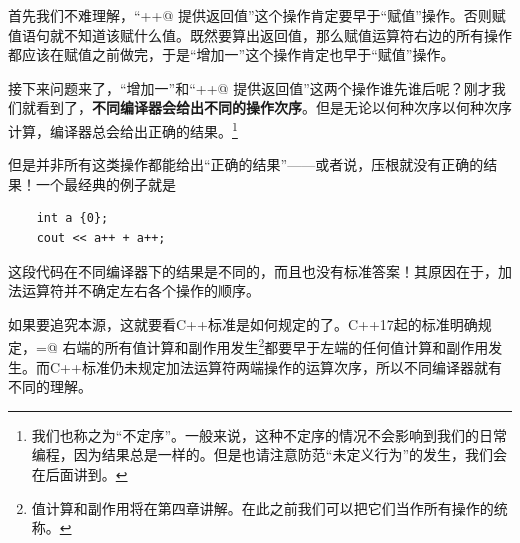 首先我们不难理解，``\lstinline@a++@ 提供返回值''这个操作肯定要早于``赋值''操作。否则赋值语句就不知道该赋什么值。既然要算出返回值，那么赋值运算符右边的所有操作都应该在赋值之前做完，于是``\lstinline@a@ 增加一''这个操作肯定也早于``赋值''操作。\par
接下来问题来了，``\lstinline@a@ 增加一''和``\lstinline@a++@ 提供返回值''这两个操作谁先谁后呢？刚才我们就看到了，\textbf{不同编译器会给出不同的操作次序}。但是无论以何种次序以何种次序计算，编译器总会给出正确的结果。\footnote{我们也称之为``不定序''。一般来说，这种不定序的情况不会影响到我们的日常编程，因为结果总是一样的。但是也请注意防范``未定义行为''的发生，我们会在后面讲到。}\par
但是并非所有这类操作都能给出``正确的结果''——或者说，压根就没有正确的结果！一个最经典的例子就是
\begin{lstlisting}
    int a {0};
    cout << a++ + a++;
\end{lstlisting}
这段代码在不同编译器下的结果是不同的，而且也没有标准答案！其原因在于，加法运算符并不确定左右各个操作的顺序。\par
如果要追究本源，这就要看C++标准是如何规定的了。C++17起的标准明确规定，\lstinline@=@ 右端的所有值计算和副作用发生\footnote{值计算和副作用将在第四章讲解。在此之前我们可以把它们当作所有操作的统称。}都要早于左端的任何值计算和副作用发生。而C++标准仍未规定加法运算符两端操作的运算次序，所以不同编译器就有不同的理解。\par
